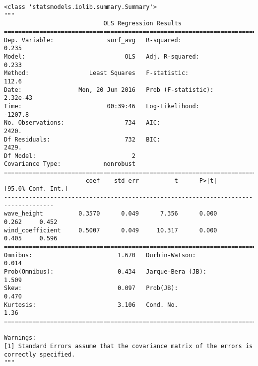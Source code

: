 \documentclass[11pt]{article}
\begin{document}
    
    \begin{verbatim}
<class 'statsmodels.iolib.summary.Summary'>
"""
                            OLS Regression Results                            
==============================================================================
Dep. Variable:               surf_avg   R-squared:                       0.235
Model:                            OLS   Adj. R-squared:                  0.233
Method:                 Least Squares   F-statistic:                     112.6
Date:                Mon, 20 Jun 2016   Prob (F-statistic):           2.32e-43
Time:                        00:39:46   Log-Likelihood:                -1207.8
No. Observations:                 734   AIC:                             2420.
Df Residuals:                     732   BIC:                             2429.
Df Model:                           2                                         
Covariance Type:            nonrobust                                         
====================================================================================
                       coef    std err          t      P>|t|      [95.0% Conf. Int.]
------------------------------------------------------------------------------------
wave_height          0.3570      0.049      7.356      0.000         0.262     0.452
wind_coefficient     0.5007      0.049     10.317      0.000         0.405     0.596
==============================================================================
Omnibus:                        1.670   Durbin-Watson:                   0.014
Prob(Omnibus):                  0.434   Jarque-Bera (JB):                1.509
Skew:                           0.097   Prob(JB):                        0.470
Kurtosis:                       3.106   Cond. No.                         1.36
==============================================================================

Warnings:
[1] Standard Errors assume that the covariance matrix of the errors is correctly specified.
"""
    \end{verbatim}

    
    \begin{center}
    \end{center}
    { \hspace*{\fill} \\}
    

    
    
    
    
\end{document}
